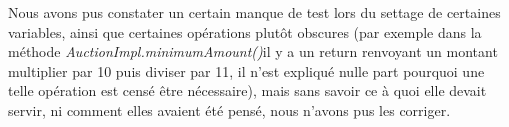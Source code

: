 \documentclass{article}
\begin{document}
Nous avons pus constater un certain manque de test lors du settage de certaines variables, ainsi que certaines opérations plutôt obscures (par exemple dans la méthode  \textit{AuctionImpl.minimumAmount()}il y a un return renvoyant un montant multiplier par 10 puis diviser par 11, il n'est expliqué nulle part pourquoi une telle opération est censé être nécessaire), mais sans savoir ce à quoi elle devait servir, ni comment elles avaient été pensé, nous n'avons pus les corriger.
\end{document}
